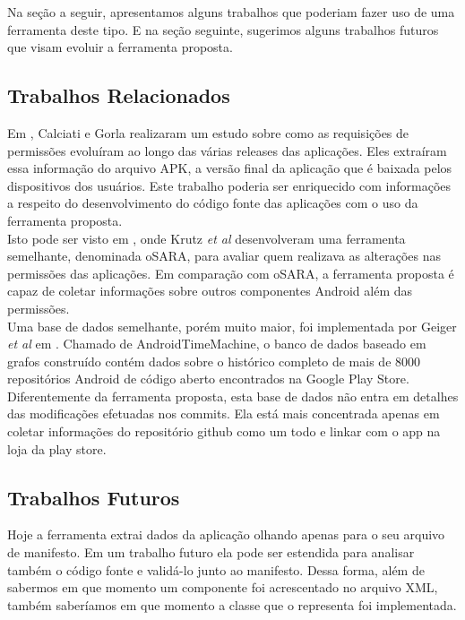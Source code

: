 \documentclass[a4paper,12pt]{article}
\begin{document}
{Na seção a seguir, apresentamos alguns trabalhos que poderiam fazer uso de uma ferramenta deste tipo. E na seção seguinte, sugerimos alguns trabalhos futuros que visam evoluir a ferramenta proposta.


\subsection{Trabalhos Relacionados}%

Em \cite{Calciati}, Calciati e Gorla realizaram um estudo sobre como as requisições de permissões evoluíram ao longo das várias releases das aplicações. Eles extraíram essa informação do arquivo APK, a versão final da aplicação que é baixada pelos dispositivos dos usuários. Este trabalho poderia ser enriquecido com informações a respeito do desenvolvimento do código fonte das aplicações com o uso da ferramenta proposta. \\

Isto pode ser visto em \cite{WhoAdded}, onde Krutz \textit{et al} desenvolveram uma ferramenta semelhante, denominada oSARA, para avaliar quem realizava as alterações nas permissões das aplicações. Em comparação com oSARA, a ferramenta proposta é capaz de coletar informações sobre outros componentes Android além das permissões.\\

Uma base de dados semelhante, porém muito maior, foi implementada por Geiger \textit{et al} em \cite{graphDB}. Chamado de AndroidTimeMachine, o banco de dados baseado em grafos construído contém dados sobre o histórico completo de mais de 8000 repositórios Android de código aberto encontrados na Google Play Store. Diferentemente da ferramenta proposta, esta base de dados não entra em detalhes das modificações efetuadas nos commits. Ela está mais concentrada apenas em coletar informações do repositório github como um todo e linkar com o app na loja da play store.


\subsection{Trabalhos Futuros}



Hoje a ferramenta extrai dados da aplicação olhando apenas para o seu arquivo de manifesto. Em um trabalho futuro ela pode ser estendida para analisar também o código fonte e validá-lo junto ao manifesto. Dessa forma, além de sabermos em que momento um componente foi acrescentado no arquivo XML, também saberíamos em que momento a classe que o representa foi implementada.

}
\end{document}
